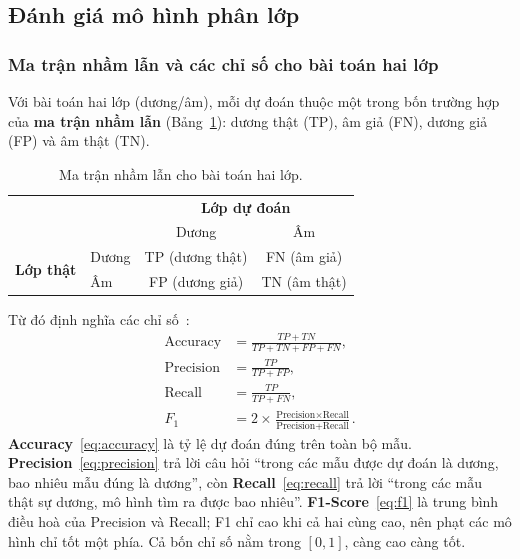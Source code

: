 \subsection{Đánh giá mô hình phân lớp}
\label{subsec:metrics}

\subsubsection{Ma trận nhầm lẫn và các chỉ số cho bài toán hai lớp}
\label{subsubsec:binary_metrics}

Với bài toán hai lớp (dương/âm), mỗi dự đoán thuộc một trong bốn trường hợp của \textbf{ma trận nhầm lẫn} (Bảng~\ref{tab:confusion}): dương thật (TP), âm giả (FN), dương giả (FP) và âm thật (TN).

\begin{table}[H]
  \centering
  \caption{Ma trận nhầm lẫn cho bài toán hai lớp.}
  \label{tab:confusion}
  \begin{tabular}{@{}llcc@{}}
    \toprule
    & & \multicolumn{2}{c}{\textbf{Lớp dự đoán}} \\
    & & Dương & Âm \\
    \midrule
    \multirow{2}{*}{\textbf{Lớp thật}} & Dương & TP (dương thật) & FN (âm giả) \\
                                      & Âm    & FP (dương giả)  & TN (âm thật) \\
    \bottomrule
  \end{tabular}
\end{table}

Từ đó định nghĩa các chỉ số~\cite{han2022}:
\begin{align}
  \text{Accuracy}  &= \frac{TP+TN}{TP+TN+FP+FN}, \label{eq:accuracy}\\[2pt]
  \text{Precision} &= \frac{TP}{TP+FP}, \label{eq:precision}\\[2pt]
  \text{Recall}    &= \frac{TP}{TP+FN}, \label{eq:recall}\\[2pt]
  F_1 &= 2\times\frac{\text{Precision}\times\text{Recall}}{\text{Precision}+\text{Recall}}. \label{eq:f1}
\end{align}
\textbf{Accuracy}~\eqref{eq:accuracy} là tỷ lệ dự đoán đúng trên toàn bộ mẫu. \textbf{Precision}~\eqref{eq:precision} trả lời câu hỏi ``trong các mẫu được dự đoán là dương, bao nhiêu mẫu đúng là dương'', còn \textbf{Recall}~\eqref{eq:recall} trả lời ``trong các mẫu thật sự dương, mô hình tìm ra được bao nhiêu''. \textbf{F1-Score}~\eqref{eq:f1} là trung bình điều hoà của Precision và Recall; F1 chỉ cao khi cả hai cùng cao, nên phạt các mô hình chỉ tốt một phía. Cả bốn chỉ số nằm trong $[0,1]$, càng cao càng tốt.

